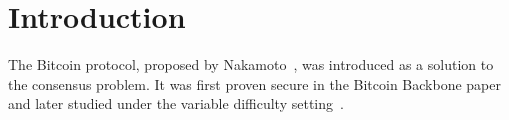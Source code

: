 \section{Introduction}

The Bitcoin protocol, proposed by Nakamoto~\cite{bitcoin}, was introduced as a
solution to the consensus problem. It was first proven secure
in the Bitcoin Backbone paper~\cite{backbone} and later studied under
the variable difficulty setting~\cite{varbackbone}.

